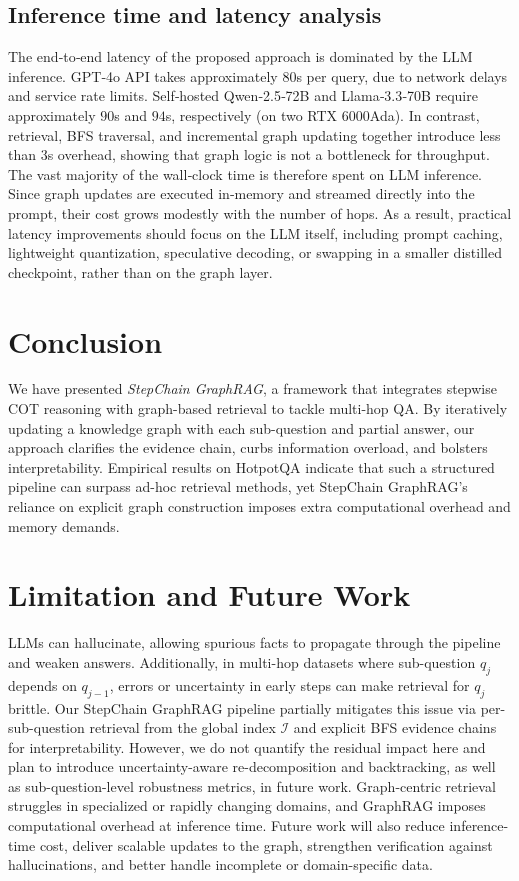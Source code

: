 \documentclass[runningheads]{llncs}
\begin{document}
\subsection{Inference time and latency analysis}
The end‑to‑end latency of the proposed approach is dominated by the LLM inference. GPT‑4o API takes approximately $80$s per query, due to network delays and service rate limits. Self‑hosted Qwen‑2.5‑72B and Llama‑3.3‑70B require approximately $90$s and $94$s, respectively (on two RTX 6000Ada). In contrast, retrieval, BFS traversal, and incremental graph updating together introduce less than $3$s overhead, showing that graph logic is not a bottleneck for throughput.  
The vast majority of the wall‑clock time is therefore spent on LLM inference. 
Since graph updates are executed in‑memory and streamed directly into the prompt, their cost grows modestly with the number of hops. As a result, practical latency improvements should focus on the LLM itself, including prompt caching, lightweight quantization, speculative decoding, or swapping in a smaller distilled checkpoint, rather than on the graph layer.



\section{Conclusion}
We have presented \textit{StepChain GraphRAG}, a framework that integrates stepwise COT reasoning with graph-based retrieval to tackle multi-hop QA. By iteratively updating a knowledge graph with each sub-question and partial answer, our approach clarifies the evidence chain, curbs information overload, and bolsters interpretability. Empirical results on HotpotQA indicate that such a structured pipeline can surpass ad-hoc retrieval methods, 
yet StepChain GraphRAG’s reliance on explicit graph construction imposes extra computational overhead and memory demands.

\section{Limitation and Future Work}
LLMs can hallucinate, allowing spurious facts to propagate through the pipeline and weaken answers. Additionally, in multi-hop datasets where sub-question \(q_j\) depends on \(q_{j-1}\), errors or uncertainty in early steps can make retrieval for \(q_j\) brittle. Our StepChain GraphRAG pipeline partially mitigates this issue via per-sub-question retrieval from the global index \(\mathcal{I}\) and explicit BFS evidence chains for interpretability. However, we do not quantify the residual impact here and plan to introduce uncertainty-aware re-decomposition and backtracking, as well as sub-question-level robustness metrics, in future work. Graph-centric retrieval struggles in specialized or rapidly changing domains, and GraphRAG imposes computational overhead at inference time. Future work will also reduce inference-time cost, deliver scalable updates to the graph, strengthen verification against hallucinations, and better handle incomplete or domain-specific data.
\end{document}
